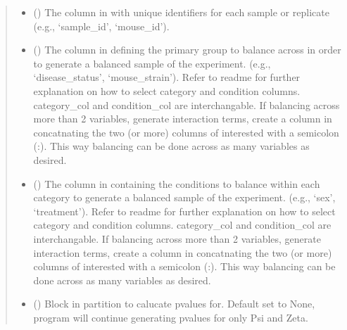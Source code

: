 \documentclass[letterpaper,10pt,english]{sphinxmanual}
\begin{document}
\begin{fulllineitems}
\begin{quote}
\begin{description}
\begin{itemize}
\item {} 
\sphinxAtStartPar
{} (\sphinxstyleliteralemphasis{\sphinxupquote{, }}) \textendash{} The column in  with unique identifiers for each sample or replicate
(e.g., ‘sample\_id’, ‘mouse\_id’).

\item {} 
\sphinxAtStartPar
{} (\sphinxstyleliteralemphasis{\sphinxupquote{, }}) \textendash{} The column in  defining the primary group to balance across in order
to generate a balanced sample of the experiment. (e.g., ‘disease\_status’, ‘mouse\_strain’).
Refer to readme for further explanation on how to select category and condition columns.
category\_col and condition\_col are interchangable.
If balancing across more than 2 variables, generate interaction terms, create a column
in  concatnating the two (or more) columns of interested with a semicolon (:).
This way balancing can be done across as many variables as desired.

\item {} 
\sphinxAtStartPar
{} (\sphinxstyleliteralemphasis{\sphinxupquote{, }}) \textendash{} The column in  containing the conditions to balance within
each category to generate a balanced sample of the experiment.  (e.g., ‘sex’, ‘treatment’).
Refer to readme for further explanation on how to select category and condition columns.
category\_col and condition\_col are interchangable.
If balancing across more than 2 variables, generate interaction terms, create a column
in  concatnating the two (or more) columns of interested with a semicolon (:).
This way balancing can be done across as many variables as desired.

\item {} 
\sphinxAtStartPar
{} (\sphinxstyleliteralemphasis{\sphinxupquote{, }}) \textendash{} Block in partition to calucate p\sphinxhyphen{}values for.
Default set to None, program will continue generating p\sphinxhyphen{}values for only Psi and Zeta.


\end{itemize}
\end{description}
\end{quote}
\end{fulllineitems}
\end{document}
